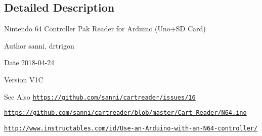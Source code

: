 \subsection{Detailed Description}
Nintendo 64 Controller Pak Reader for Arduino (Uno+\-S\-D Card) \begin{DoxyAuthor}{Author}
sanni, drtrigon 
\end{DoxyAuthor}
\begin{DoxyDate}{Date}
2018-\/04-\/24 
\end{DoxyDate}
\begin{DoxyVersion}{Version}
V1\-C
\end{DoxyVersion}
\begin{DoxySeeAlso}{See Also}
\href{https://github.com/sanni/cartreader/issues/16}{\tt https\-://github.\-com/sanni/cartreader/issues/16} 

\href{https://github.com/sanni/cartreader/blob/master/Cart_Reader/N64.ino}{\tt https\-://github.\-com/sanni/cartreader/blob/master/\-Cart\-\_\-\-Reader/\-N64.\-ino} 

\href{http://www.instructables.com/id/Use-an-Arduino-with-an-N64-controller/}{\tt http\-://www.\-instructables.\-com/id/\-Use-\/an-\/\-Arduino-\/with-\/an-\/\-N64-\/controller/}
\end{DoxySeeAlso}
